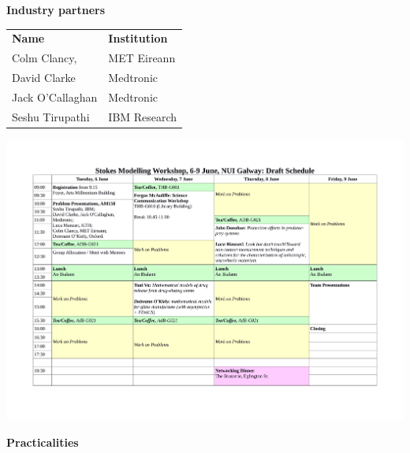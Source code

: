 \documentclass[a4paper, 11pt]{article}
\begin{document}
\vspace{1cm}

{\textbf{\huge Industry partners}}\\

\begin{minipage}[t]{0.45\textwidth}
\begin{tabular}{l l}
\textbf{Name}&\textbf{Institution}\\
Colm Clancy, & MET Eireann\\
  David Clarke & Medtronic\\
  Jack O'Callaghan & Medtronic\\
  Seshu Tirupathi  & IBM Research
\end{tabular}
\end{minipage}



\break
\onehalfspace

\hspace*{-50pt}\includegraphics[angle=90,width=1.1\textwidth]{Schedule1}

\newpage


{\textbf{\huge Practicalities}}\\
\end{document}
